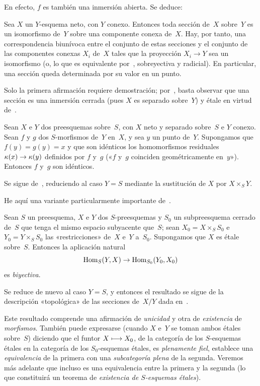 En efecto, $f$ es también una inmersión abierta. Se deduce:

\begin{corollaire}
\label{I.5.3}
Sea
$X$ un $Y$-esquema neto, con $Y$ conexo. Entonces toda sección de~$X$ sobre~$Y$ es un isomorfismo de~$Y$ sobre una componente conexa de~$X$. Hay, por tanto, una correspondencia biunívoca entre el conjunto de estas secciones y el conjunto de las componentes conexas $X_i$ de~$X$ tales que la proyección $X_i\to Y$ sea un isomorfismo (o, lo que es equivalente por~, sobreyectiva y radicial). En particular, una sección queda determinada por su valor en un punto.
\end{corollaire}

Solo la primera afirmación requiere demostración; por~, basta observar que una sección es una inmersión cerrada (pues $X$ es separado sobre~$Y$) y étale en virtud de~.

\begin{corollaire}
\label{I.5.4}
Sean $X$ e $Y$ dos preesquemas sobre~$S$, con $X$ neto y separado sobre~$S$ e $Y$ conexo. Sean $f$ y $g$ dos $S$-morfismos de~$Y$ en~$X$, y sea $y$ un punto de~$Y$. Supongamos que $f(y)=g(y)=x$ y que son idénticos los homomorfismos residuales $\kappa(x)\to\kappa(y)$ definidos por $f$ y~$g$ («$f$ y~$g$ coinciden geométricamente en~$y$»). Entonces $f$ y~$g$ son idénticos.
\end{corollaire}

Se sigue de~, reduciendo al caso $Y=S$ mediante la sustitución de $X$ por $X\times_S Y$.

He aquí una variante particularmente importante de~.

\begin{theoreme}
\label{I.5.5}
Sean $S$ un preesquema, $X$ e $Y$ dos $S$-preesquemas y $S_0$ un subpreesquema cerrado de~$S$ que tenga el mismo espacio subyacente que~$S$; sean $X_0=X\times_S S_0$ e $Y_0=Y\times_S S_0$ las «restricciones» de~$X$ e~$Y$ a~$S_0$. Supongamos que $X$ es étale sobre~$S$. Entonces la aplicación natural
$$
\operatorname{Hom}_S(Y,X)\to\operatorname{Hom}_{S_0}(Y_0,X_0)
$$
es \emph{biyectiva}.
\end{theoreme}

Se reduce de nuevo al caso $Y=S$, y entonces el resultado se sigue de la descripción «topológica» de las secciones de~$X/Y$ dada en~.

\begin{scholiestar}
Este resultado comprende una afirmación de \emph{unicidad} y otra de \emph{existencia} de \emph{morfismos}. También puede expresarse (cuando $X$ e~$Y$ se toman ambos étales sobre~$S$) diciendo que el funtor $X\longmapsto X_0$, de la categoría de los $S$-esquemas étales en la categoría de los $S_0$-esquemas étales, es \emph{plenamente fiel}, \ie establece una \emph{equivalencia} de la primera con una \emph{subcategoría plena} de la segunda. Veremos más adelante que incluso es una equivalencia entre la primera y la segunda (lo que constituirá un teorema de \emph{existencia de $S$-esquemas étales}).
\end{scholiestar}

